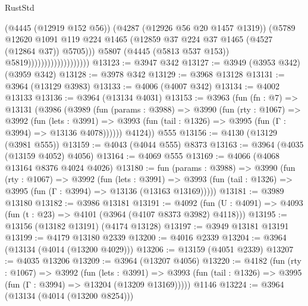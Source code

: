 \begin{lexlean}{RustStd}
\begin{coremodule}
{\begin{coremodule}
{{{{{{{{{{{{{{{{{{{{{{{{{{{{{{{{{{{{{{                                            (@4445 (@12919 @152 @56))
                                            (@4287 (@12926 @56 @20 @1457 @1319))
                                            (@5789
                                              @12620
                                              @1091
                                              @119
                                              @224
                                              @1465
                                              (@12859
                                                @37
                                                @224
                                                @37
                                                @1465
                                                (@4527 (@12864 @37))
                                                @5705)))
                                          @5807
                                          (@4445 (@5813 @537 @153))
                                          @5819)))))))))))))))))))
@13123 := @3947 @342
@13127 := @3949 (@3953 @342) (@3959 @342)
@13128 := @3978 @342
@13129 := @3968 @13128
@13131 := @3964 (@13129 @3983)
@13133 := @4006 (@4007 @342)
@13134 := @4002 @13133
@13136 := @3964 (@13134 @4031)
@13153 := @3963
    (fun (fn : @7) =>
    @13131
      (@3986
        (@3989
          (fun (params : @3988) =>
          @3990
            (fun (rty : @1067) =>
            @3992
              (fun (lets : @3991) =>
              @3993 (fun (tail : @1326) => @3995 (fun (Γ : @3994) => @13136 @4078))))))
        @4124))
    @555
@13156 := @4130 (@13129 (@3981 @555))
@13159 := @4043 (@4044 @555) @8373
@13163 := @3964 (@4035 (@13159 @4052) @4056)
@13164 := @4069 @555
@13169 := @4066 (@4068 @13164 @8376 @4024 @4026)
@13180 := fun (params : @3988) =>
  @3990
    (fun (rty : @1067) =>
    @3992
      (fun (lets : @3991) =>
      @3993 (fun (tail : @1326) => @3995 (fun (Γ : @3994) => @13136 (@13163 @13169)))))
@13181 := @3989 @13180
@13182 := @3986 @13181
@13191 := @4092
    (fun (U : @4091) => @4093 (fun (t : @23) => @4101 (@3964 (@4107 @8373 @3982) @4118)))
@13195 := @13156 (@13182 @13191) (@4174 @13128)
@13197 := @3949 @13181 @13191
@13199 := @4179 @13180 @2339
@13200 := @4016 @2339
@13204 := @3964 (@13134 (@4014 (@13200 @4029)))
@13206 := @13159 (@4051 @2339)
@13207 := @4035 @13206
@13209 := @3964 (@13207 @4056)
@13220 := @4182
    (fun (rty : @1067) =>
    @3992
      (fun (lets : @3991) =>
      @3993 (fun (tail : @1326) => @3995 (fun (Γ : @3994) => @13204 (@13209 @13169)))))
    @1146
@13224 := @3964 (@13134 (@4014 (@13200 @8254)))
}}}}}}}}}}}}}}}}}}}}}}}}}}}}}}}}}}}}}}
\end{coremodule}}
\end{coremodule}
\end{lexlean}
